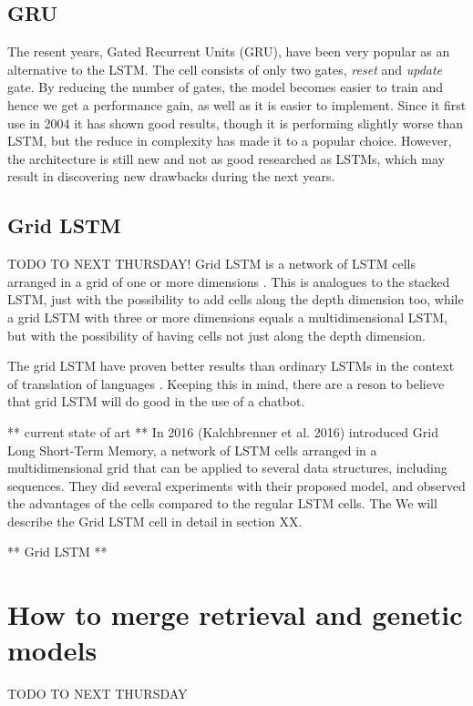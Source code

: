\documentclass{article} %
\begin{document}
\subsection{GRU}
The resent years, Gated Recurrent Units (GRU), have been very popular as an alternative to the LSTM. The cell consists of only two gates, \textit{reset} and \textit{update} gate. By reducing the number of gates, the model becomes easier to train and hence we get a performance gain, as well as it is easier to implement. Since it first use in 2004 \cite{Cho} it has shown good results, though it is performing slightly worse than LSTM, but the reduce in complexity has made it to a popular choice. However, the architecture is still new and not as good researched as LSTMs, which may result in discovering new drawbacks during the next years.

\subsection{Grid LSTM}
TODO TO NEXT THURSDAY!
Grid LSTM is a network of LSTM cells arranged in a grid of one or more dimensions \cite{gridLSTM}. This is analogues to the stacked LSTM, just with the possibility to add cells along the depth dimension too, while a grid LSTM with three or more dimensions equals a multidimensional LSTM, but with the possibility of having cells not just along the depth dimension.



The grid LSTM have proven better results than ordinary LSTMs in the context of translation of languages \cite{gridLSTM}. Keeping this in mind, there are a reson to believe that grid LSTM will do good in the use of a chatbot.





** current state of art ** 
In 2016 (Kalchbrenner et al. 2016) introduced Grid Long Short-Term Memory, a network of LSTM cells arranged in a multidimensional grid that can be applied to several data structures, including sequences. They did several experiments with their proposed model, and observed the advantages of the cells compared to the regular LSTM cells. The  We will describe the Grid LSTM cell in detail in section XX. 


** Grid LSTM **



\section{How to merge retrieval and genetic models}
TODO TO NEXT THURSDAY
\end{document}
